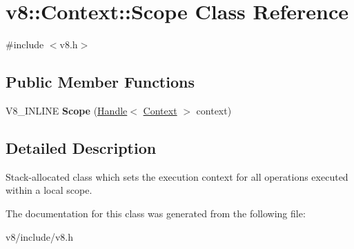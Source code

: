 \hypertarget{classv8_1_1Context_1_1Scope}{}\section{v8\+:\+:Context\+:\+:Scope Class Reference}
\label{classv8_1_1Context_1_1Scope}


{\ttfamily \#include $<$v8.\+h$>$}

\subsection*{Public Member Functions}
\begin{DoxyCompactItemize}
\item 
\hypertarget{classv8_1_1Context_1_1Scope_a171c1cb92354b52c8b1764e88b9540c8}{}V8\+\_\+\+I\+N\+L\+I\+N\+E {\bfseries Scope} (\hyperlink{classv8_1_1Handle}{Handle}$<$ \hyperlink{classv8_1_1Context}{Context} $>$ context)\label{classv8_1_1Context_1_1Scope_a171c1cb92354b52c8b1764e88b9540c8}

\end{DoxyCompactItemize}


\subsection{Detailed Description}
Stack-\/allocated class which sets the execution context for all operations executed within a local scope. 

The documentation for this class was generated from the following file\+:\begin{DoxyCompactItemize}
\item 
v8/include/v8.\+h\end{DoxyCompactItemize}
